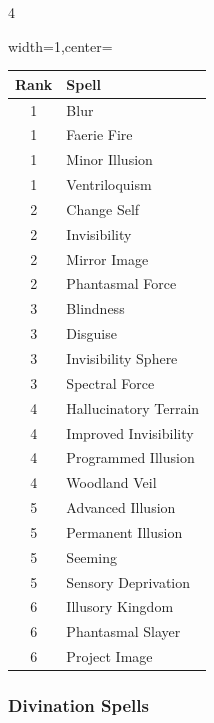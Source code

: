 \documentclass{book}
\begin{document}
\begin{multicols}{4}
\begin{table}[H]
	\begin{adjustbox}{width=1\columnwidth,center=\columnwidth}
		\begin{tabular}{cl}
			\toprule
			Rank & Spell \\
			\midrule
			1 & Blur \\
			1 & Faerie Fire \\
			1 & Minor Illusion \\
			1 & Ventriloquism \\
			2 & Change Self \\
			2 & Invisibility \\
			2 & Mirror Image \\
			2 & Phantasmal Force \\
			3 & Blindness \\
			3 & Disguise \\
			3 & Invisibility Sphere \\
			3 & Spectral Force \\
			4 & Hallucinatory Terrain \\
			4 & Improved Invisibility \\
			4 & Programmed Illusion \\
			4 & Woodland Veil \\
			5 & Advanced Illusion \\
			5 & Permanent Illusion \\
			5 & Seeming \\
			5 & Sensory Deprivation \\
			6 & Illusory Kingdom \\
			6 & Phantasmal Slayer \\
			6 & Project Image \\
			\bottomrule
		\end{tabular}
	\end{adjustbox}
\end{table}

\columnbreak
	
	\subsubsection*{Divination Spells}\label{divination-spells}
	

\end{multicols}
\end{document}

